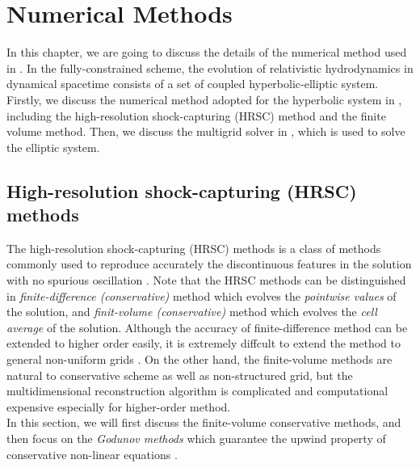 
\chapter{Numerical Methods}  %

\ifpdf
    \graphicspath{{Chapter3/Figs/PDF/}{Chapter3/Figs/}}
\else
    \graphicspath{{Chapter3/Figs/}}
\fi

In this chapter, we are going to discuss the details of the numerical method used in .
In the fully-constrained scheme, the evolution of relativistic hydrodynamics in dynamical spacetime
consists of a set of coupled hyperbolic-elliptic system.
Firstly, we discuss the numerical method adopted for the hyperbolic system in ,
including the high-resolution shock-capturing (HRSC) method and the finite volume method.
Then, we discuss the multigrid solver in ,
which is used to solve the elliptic system.

\section{High-resolution shock-capturing (HRSC) methods}
The high-resolution shock-capturing (HRSC) methods is a class of methods commonly used to
reproduce accurately the discontinuous features in the solution
with no spurious oscillation \cite{harten1997high}.
Note that the HRSC methods can be distinguished in \textit{finite-difference (conservative)} method
which evolves the \textit{pointwise values} of the solution,
and \textit{finit-volume (conservative)} method which evolves the \textit{cell average} of the solution.
Although the accuracy of finite-difference method can be extended to higher order easily,
it is extremely diffcult to extend the method to general non-uniform grids \cite{merriman2003understanding}.
On the other hand,
the finite-volume methods are natural to conservative scheme as well as non-structured grid,
but the multidimensional reconstruction algorithm is complicated and computational expensive especially for higher-order method.\\
In this section,
we will first discuss the finite-volume conservative methods,
and then focus on the \textit{Godunov methods} which guarantee the upwind property of conservative non-linear equations \cite{van1999introduction}.

